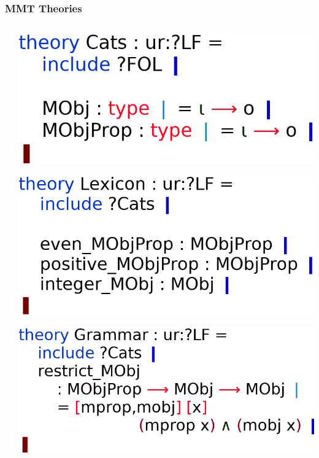 \documentclass[usenames,dvipsnames,handout]{beamer}
\begin{document}
\begin{frame}[fragile]
    \frametitle{MMT Theories}

    \begin{columns}
        \begin{column}{0.45\textwidth}
            

            

            
        \end{column}

        \begin{column}{0.45\textwidth}
            \includegraphics[scale=0.2]{figures/cats_mmt.png}

            \vspace{0.8em}
            \includegraphics[scale=0.2]{figures/lexicon_mmt.png}

            \vspace{0.8em}
            \includegraphics[scale=0.2]{figures/grammar_mmt.png}
        \end{column}
    \end{columns}
\end{frame}
\end{document}

